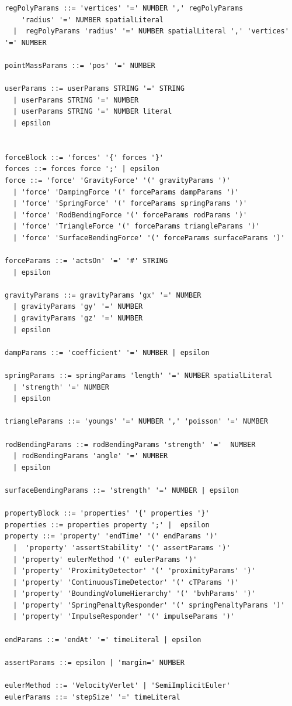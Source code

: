 \begin{verbatim}
regPolyParams ::= 'vertices' '=' NUMBER ',' regPolyParams 
    'radius' '=' NUMBER spatialLiteral
  |  regPolyParams 'radius' '=' NUMBER spatialLiteral ',' 'vertices' '=' NUMBER

pointMassParams ::= 'pos' '=' NUMBER

userParams ::= userParams STRING '=' STRING 
  | userParams STRING '=' NUMBER 
  | userParams STRING '=' NUMBER literal
  | epsilon


forceBlock ::= 'forces' '{' forces '}'
forces ::= forces force ';' | epsilon
force ::= 'force' 'GravityForce' '(' gravityParams ')' 
  | 'force' 'DampingForce '(' forceParams dampParams ')' 
  | 'force' 'SpringForce' '(' forceParams springParams ')' 
  | 'force' 'RodBendingForce '(' forceParams rodParams ')' 
  | 'force' 'TriangleForce '(' forceParams triangleParams ')' 
  | 'force' 'SurfaceBendingForce' '(' forceParams surfaceParams ')' 

forceParams ::= 'actsOn' '=' '#' STRING
  | epsilon

gravityParams ::= gravityParams 'gx' '=' NUMBER
  | gravityParams 'gy' '=' NUMBER
  | gravityParams 'gz' '=' NUMBER
  | epsilon

dampParams ::= 'coefficient' '=' NUMBER | epsilon

springParams ::= springParams 'length' '=' NUMBER spatialLiteral
  | 'strength' '=' NUMBER
  | epsilon

triangleParams ::= 'youngs' '=' NUMBER ',' 'poisson' '=' NUMBER

rodBendingParams ::= rodBendingParams 'strength' '='  NUMBER
  | rodBendingParams 'angle' '=' NUMBER
  | epsilon

surfaceBendingParams ::= 'strength' '=' NUMBER | epsilon

propertyBlock ::= 'properties' '{' properties '}'
properties ::= properties property ';' |  epsilon
property ::= 'property' 'endTime' '(' endParams ')' 
  |  'property' 'assertStability' '(' assertParams ')' 
  | 'property' eulerMethod '(' eulerParams ')' 
  | 'property' 'ProximityDetector' '(' 'proximityParams' ')' 
  | 'property' 'ContinuousTimeDetector' '(' cTParams ')'
  | 'property' 'BoundingVolumeHierarchy' '(' 'bvhParams' ')'
  | 'property' 'SpringPenaltyResponder' '(' springPenaltyParams ')'
  | 'property' 'ImpulseResponder' '(' impulseParams ')'

endParams ::= 'endAt' '=' timeLiteral | epsilon 

assertParams ::= epsilon | 'margin=' NUMBER 

eulerMethod ::= 'VelocityVerlet' | 'SemiImplicitEuler'
eulerParams ::= 'stepSize' '=' timeLiteral


\end{verbatim}
